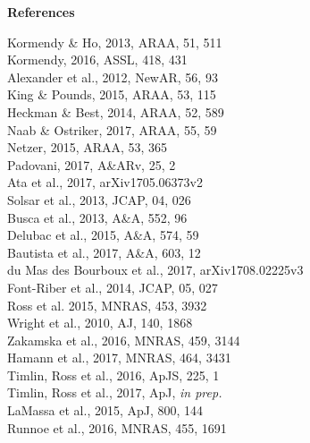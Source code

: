 \documentclass[oneside, a4paper, onecolumn, 11pt]{article}
\begin{document}
%


\begin{center}
\medskip
 \medskip
 {\large \bf References}
    \vspace{-10pt}
\end{center}
\begin{multicols}{3}[]
\noindent
\scriptsize
{}\rbrack Kormendy \& Ho, 2013, ARAA, 51, 511\\
\rbrack Kormendy,  2016, ASSL, 418, 431\\
\rbrack Alexander et al., 2012, NewAR, 56, 93\\
\rbrack King \& Pounds, 2015, ARAA, 53, 115 \\
\rbrack Heckman \& Best, 2014, ARAA, 52, 589\\
\rbrack Naab \& Ostriker, 2017, ARAA, 55, 59 \\
\rbrack Netzer, 2015, ARAA, 53,  365\\
\rbrack Padovani, 2017, A\&ARv, 25, 2\\
\rbrack Ata et al., 2017, arXiv1705.06373v2\\
\rbrack Solsar et al., 2013, JCAP, 04, 026 \\
\rbrack Busca et al.,  2013, A\&A, 552, 96 \\
\rbrack Delubac et al.,  2015, A\&A, 574, 59 \\
\rbrack Bautista et al., 2017, A\&A, 603, 12 \\
\rbrack du Mas des Bourboux et al., 2017, arXiv1708.02225v3\\
\rbrack Font-Riber et al., 2014, JCAP, 05, 027\\
\rbrack Ross et al. 2015, MNRAS, 453, 3932\\
\rbrack Wright et al., 2010, AJ, 140, 1868\\
\rbrack Zakamska et al., 2016, MNRAS, 459, 3144\\
\rbrack Hamann et al., 2017, MNRAS, 464, 3431\\
\rbrack Timlin, Ross et al., 2016, ApJS, 225, 1\\
\rbrack Timlin, Ross et al., 2017, ApJ, {\it in prep.}\\
\rbrack LaMassa et al., 2015, ApJ, 800, 144\\
\rbrack Runnoe et al., 2016, MNRAS, 455, 1691\\

\end{multicols}
\end{document}
